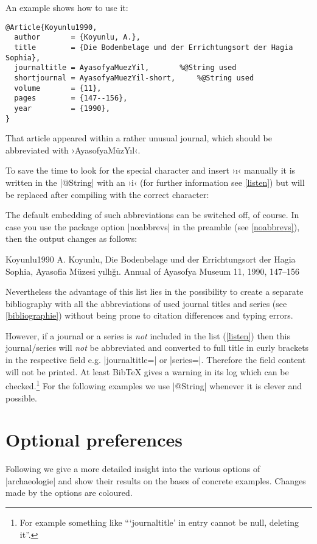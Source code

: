 \documentclass[a4paper,
10pt,
greek,
french,
spanish,
italian,
ngerman,
english
]{ltxdoc}
\begin{document}
An example shows how to use it:
\begin{lstlisting}[style=bibentry,label=Koyunlu1990,caption={{@}Article\{Koyunlu1990,…\} }]
@Article{Koyunlu1990,
  author       = {Koyunlu, A.},
  title        = {Die Bodenbelage und der Errichtungsort der Hagia Sophia},
  journaltitle = AyasofyaMuezYil,		%@String used
  shortjournal = AyasofyaMuezYil-short,		%@String used
  volume       = {11},
  pages        = {147--156},
  year         = {1990},
}
\end{lstlisting}

That article appeared within a rather unusual journal, 
which should be abbreviated with ›AyasofyaMüzYıl‹.

To save the time to look for the special character and insert ›ı‹ manually 
it is written in the |@String| with an ›i‹ (for further information see \cref{listen}) but will be replaced after compiling with the correct character:


The default embedding of such abbreviations can be switched off, of course.
In case you use the package option |noabbrevs| in the preamble (see \cref{noabbrevs}), then the output changes as follows:
\begin{bibbsp}{Koyunlu1990}
A. Koyunlu, Die Bodenbelage und der Errichtungsort der Hagia Sophia, {\color{red}Ayasofia Müzesi yıllığı. Annual of Ayasofya Museum} 11, 1990, 147–156
\end{bibbsp}
Nevertheless the advantage of this list lies in the possibility to create a separate bibliography with all the abbreviations of used journal titles and series (see \cref{bibliographie}) without being prone to citation differences and typing errors.

However, if a journal or a series is \emph{not} included in the list (\cref{listen}) 
then this journal/series will \emph{not} be abbreviated and converted to full title in curly brackets in the respective field e.g. |journaltitle=| or |series=|. Therefore the field content will not be printed. At least BibTeX gives a warning in its log which can be checked.\footnote{For example something like \enquote{\enquote{journaltitle} in entry  cannot be null, deleting it}.}
For the following examples we use |@String| whenever it is clever and possible.


\section{Optional preferences}
Following we give a more detailed insight into the various options of |archaeologie| 
and show their results on the bases of concrete examples.
Changes made by the options are {\color{red}coloured}.
\end{document}
